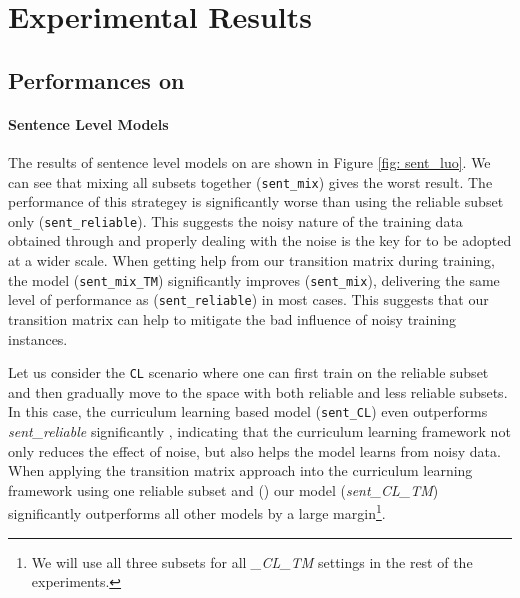 \section{Experimental Results \label{sec:evaluation}}

\subsection{Performances on \TimeRE}
\paragraph{Sentence Level Models}
The results of sentence level models on \TimeRE are shown in Figure \ref{fig:
sent_luo}. We can see that mixing all subsets together (\texttt{sent\_mix})
gives the worst result. The performance of this strategey is significantly
worse than using the reliable subset only (\texttt{sent\_reliable}). This
suggests the noisy nature of the training data obtained through \DS and
properly dealing with the noise is the key for \DS to be adopted at a wider
scale. When getting help from our transition matrix during training, the
model (\texttt{sent\_mix\_TM}) significantly improves (\texttt{sent\_mix}),
delivering the same level of performance as (\texttt{sent\_reliable}) in most
cases. This suggests that our transition matrix can help to mitigate the bad influence of noisy training instances.


Let us consider the \texttt{CL} scenario where one can first train on the
reliable subset and then gradually move to the space with both reliable and  less
reliable subsets. In this case, the curriculum learning based model
(\texttt{sent\_CL}) even  outperforms \emph{sent\_reliable} significantly  ,
indicating that the curriculum learning framework not only reduces the effect
of noise, but also helps the model learns from noisy data. When applying the
transition matrix approach into the curriculum learning framework using one reliable
subset and 
()
our model (\emph{sent\_CL\_TM}) significantly outperforms all
other models by a large margin\footnote{We will use all three subsets for all
\emph{\_CL\_TM} settings in the rest of the experiments.}. 


